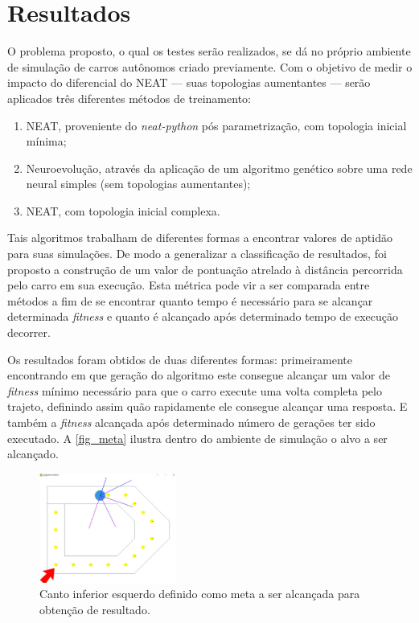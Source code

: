 \chapter{Resultados}

O problema proposto, o qual os testes serão realizados, se dá no próprio
ambiente de simulação de carros autônomos criado previamente. Com o objetivo de
medir o impacto do diferencial do NEAT — suas topologias aumentantes — serão
aplicados tr{\^e}s diferentes m{\'e}todos de treinamento:

\begin{enumerate}
	\item NEAT, proveniente do \textit{neat-python} pós parametrização, com topologia inicial m{\'i}nima;
	\item Neuroevolução, através da aplicação de um algoritmo genético sobre uma rede neural simples (sem topologias aumentantes);
	\item NEAT, com topologia inicial complexa.
\end{enumerate}

Tais algoritmos trabalham de diferentes formas a encontrar valores de aptidão
para suas simulações. De modo a generalizar a classificação de resultados, foi
proposto a construção de um valor de pontua{\c c}{\~a}o atrelado à distância
percorrida pelo carro em sua execução.  Esta métrica pode vir a ser comparada
entre métodos a fim de se encontrar quanto tempo é necessário para se alcançar
determinada \textit{fitness} e quanto é alcançado após determinado tempo de
execução decorrer.

Os resultados foram obtidos de duas diferentes formas: primeiramente
encontrando em que geração do algoritmo este consegue alcançar um valor de
\textit{fitness} mínimo necessário para que o carro execute uma volta completa pelo
trajeto, definindo assim quão rapidamente ele consegue alcançar uma resposta. 
E também a \textit{fitness} alcançada após determinado número de gerações ter sido executado. A
\autoref{fig_meta} ilustra dentro do ambiente de simulação o alvo a ser alcançado.

\begin{figure}[htb]
        \centering
        \caption{\label{fig_meta}Canto inferior esquerdo definido como meta a ser alcançada para obtenção de resultado.}
        \includegraphics[width=0.4\textwidth]{images/meta.png}
\end{figure}

